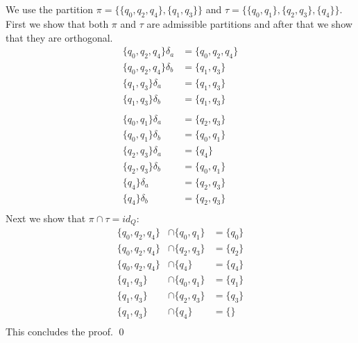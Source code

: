 \documentclass[a4paper,12pt,numbers=noenddot]{scrreport}
\begin{document}
\section{}
We use the partition $\pi = \{\{q_0, q_2,q_4\}, \{q_1, q_3\}\}$ and $\tau = \{\{q_0, q_1\}, \{q_2, q_3\}, \{q_4\}\}$. First we show that both $\pi$ and $\tau$ are admissible partitions and after that we show that they are orthogonal.\\
\begin{align*}
    \{q_0, q_2,q_4\}\delta_a    &= \{q_0, q_2,q_4\}\\
    \{q_0, q_2,q_4\}\delta_b    &= \{q_1, q_3\}\\
    \{q_1, q_3\}\delta_a        &= \{q_1, q_3\}\\
    \{q_1, q_3\}\delta_b        &= \{q_1, q_3\}\\
    ~\\
    \{q_0, q_1\}\delta_a        &= \{q_2, q_3\}\\
    \{q_0, q_1\}\delta_b        &= \{q_0, q_1\}\\
    \{q_2, q_3\}\delta_a        &= \{q_4\}\\
    \{q_2, q_3\}\delta_b        &= \{q_0, q_1\}\\
    \{q_4\}\delta_a             &= \{q_2, q_3\}\\
    \{q_4\}\delta_b             &= \{q_2, q_3\}\\
\end{align*}
Next we show that $\pi \cap \tau = id_Q$:\\
\begin{align*}
    \{q_0, q_2,q_4\}    &\cap \{q_0, q_1\}  &= \{q_0\}\\
    \{q_0, q_2,q_4\}    &\cap \{q_2, q_3\}  &= \{q_2\}\\
    \{q_0, q_2,q_4\}    &\cap \{q_4\}       &= \{q_4\}\\
    \{q_1, q_3\}        &\cap \{q_0, q_1\}  &= \{q_1\}\\
    \{q_1, q_3\}        &\cap \{q_2, q_3\}  &= \{q_3\}\\
    \{q_1, q_3\}        &\cap \{q_4\}       &= \{\}\\
\end{align*}
This concludes the proof. 
\qed
\end{document}
